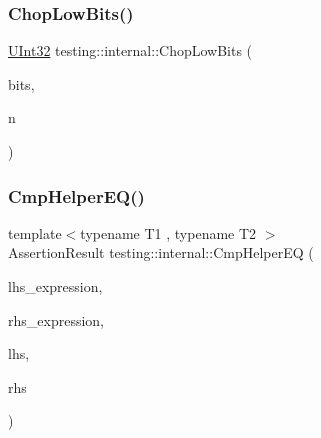 \mbox{\label{namespacetesting_1_1internal_a2c54b453387aa8a18f2f3e09f10b5a7d}} 
\subsubsection{\texorpdfstring{ChopLowBits()}{ChopLowBits()}}
{\footnotesize\ttfamily \mbox{\hyperlink{namespacetesting_1_1internal_a40d4fffcd2bf56f18b1c380615aa85e3}{U\+Int32}} testing\+::internal\+::\+Chop\+Low\+Bits (\begin{DoxyParamCaption}\item[{\mbox{\hyperlink{namespacetesting_1_1internal_a40d4fffcd2bf56f18b1c380615aa85e3}{U\+Int32}} $\ast$}]{bits,  }\item[{int}]{n }\end{DoxyParamCaption})\hspace{0.3cm}{\ttfamily [inline]}}

\mbox{\label{namespacetesting_1_1internal_a4638c74d9b32e971f9b321af6fafc2f1}} 
\subsubsection{\texorpdfstring{CmpHelperEQ()}{CmpHelperEQ()}\hspace{0.1cm}{\footnotesize\ttfamily [1/2]}}
{\footnotesize\ttfamily template$<$typename T1 , typename T2 $>$ \\
Assertion\+Result testing\+::internal\+::\+Cmp\+Helper\+EQ (\begin{DoxyParamCaption}\item[{const char $\ast$}]{lhs\+\_\+expression,  }\item[{const char $\ast$}]{rhs\+\_\+expression,  }\item[{const T1 \&}]{lhs,  }\item[{const T2 \&}]{rhs }\end{DoxyParamCaption})}

\mbox{\label{namespacetesting_1_1internal_a46582d95cbfe3d3d8f6945c9e9cd779c}} 
